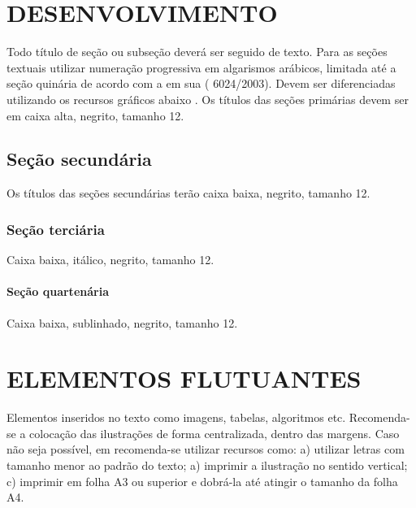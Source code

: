 \chapter{DESENVOLVIMENTO}

Todo título de seção ou subseção deverá ser seguido de texto.
Para as seções textuais utilizar numeração progressiva em algarismos arábicos, limitada até a seção quinária de acordo com 
a  em sua ( 6024/2003). Devem ser diferenciadas utilizando os recursos gráficos abaixo \cite{manualpuc}.
Os títulos das seções primárias devem ser em caixa alta, negrito, tamanho 12.

\section{\esp Seção secundária}

Os títulos das seções secundárias terão caixa baixa, negrito, tamanho 12.

\subsection{\esp Seção terciária}

Caixa baixa, itálico, negrito, tamanho 12.

\subsubsection{\esp Seção quartenária}
 
 Caixa baixa, sublinhado, negrito, tamanho 12.
 
 

\chapter{ELEMENTOS FLUTUANTES}

Elementos inseridos no texto como imagens, tabelas, algoritmos etc.
Recomenda-se a colocação das ilustrações de forma centralizada, dentro das margens. 
Caso não seja possível, em  recomenda-se utilizar recursos como: 
 a) utilizar letras com tamanho menor ao padrão do texto; a) imprimir a ilustração no sentido vertical; 
 c) imprimir em folha A3 ou superior e dobrá-la até atingir o tamanho da folha A4. 

